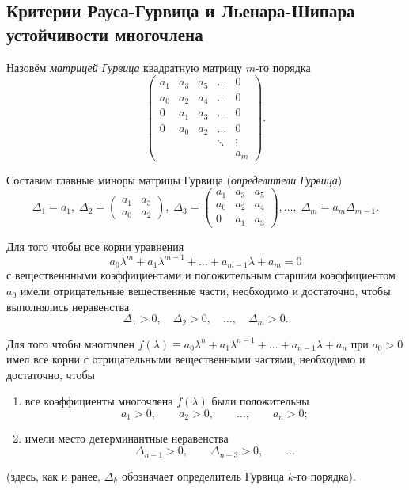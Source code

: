 \documentclass[a4paper]{article}
\begin{document}
\subsection{Критерии Рауса-Гурвица и Льенара-Шипара устойчивости многочлена}
\begin{dfn}
	 Назовём \emph{матрицей Гурвица} квадратную  матрицу $m$-го порядка
	 \[
		 \begin{pmatrix} a_1 & a_3 & a_5 & \ldots & 0\\
		 a_0 & a_2 & a_4 & \ldots & 0 \\
	 0 & a_1 & a_3 & \ldots & 0\\
 0 & a_0 & a_2 & \ldots & 0 \\
  & & & \ddots & \vdots\\
  & & & & a_m
 \end{pmatrix} 
	  .\] 
\end{dfn}
Составим главные миноры  матрицы Гурвица (\emph{определители Гурвица})
\[
	\Delta_1=a_1, \; \Delta_2 = \begin{pmatrix} a_1 & a_3 \\ a_0 & a_2 \end{pmatrix},
	\; \Delta_3= \begin{pmatrix} a_1 & a_3 & a_5 \\ a_0 & a_2 & a_4 \\
	0 & a_1 & a_3\end{pmatrix} ,\ldots,\; \Delta_m =a_m \Delta_{m-1}
.\] 
\begin{thm}
	Для того чтобы все корни уравнения
	\[
	a_0 \lambda^m+a_1 \lambda^{m-1}+\ldots+a_{m-1}\lambda+a_m=0
	\]
	с вещественнными коэффициентами и положительным старшим  коэффициентом
	$a_0$ имели отрицательные вещественные   части, необходимо и достаточно,
	чтобы выполнялись неравенства
	\[
	\Delta_1>0,\quad\Delta_2>0,\quad \ldots, \quad \Delta_m >0
	.\] 
\end{thm}
\begin{thm}
	 Для того чтобы многочлен
	$f(\lambda)\equiv a_0 \lambda^n+a_1 
	\lambda^{n-1}+\ldots+a_{n-1}\lambda+a_n$ при $a_0>0$ имел все корни
	с отрицательными вещественными частями, необходимо и достаточно, чтобы
	\begin{enumerate}
		\item все коэффициенты многочлена $f(\lambda)$ были
			положительны
			 \[
			a_1>0,\qquad a_2>0,\qquad \ldots, \qquad a_n>0;
			\]
		\item имели место детерминантные неравенства
			 \[
			\Delta_{n-1}>0, \qquad \Delta_{n-3}>0,\qquad \ldots
			\]
	\end{enumerate}
	(здесь, как и ранее, $\Delta_k$ обозначает определитель Гурвица $k$-го
	порядка).
\end{thm}
\end{document}
